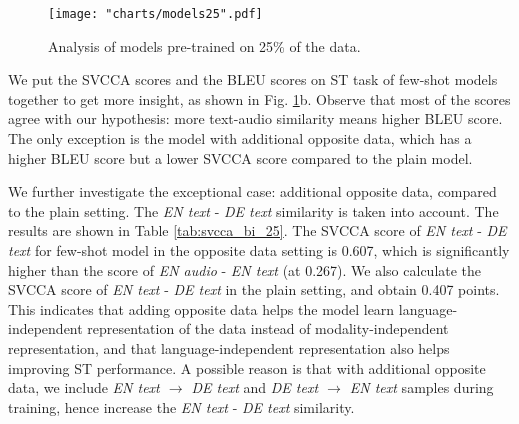 \documentclass[conference]{IEEEtran}
\begin{document}
	\begin{figure}[htbp]
		\centerline{\texttt{[image: "charts/models25".pdf]}}
		\caption{Analysis of models pre-trained on 25\% of the data.}
		\label{fig:models25}
	\end{figure}
	
	
	
	We put the SVCCA scores and the BLEU scores on ST task of few-shot models together to get more insight, as shown in Fig. \ref{fig:models25}b. Observe that most of the scores agree with our hypothesis: more text-audio similarity means higher BLEU score. The only exception is the model with additional opposite data, which has a higher BLEU score but a lower SVCCA score compared to the plain model.
	
	
	We further investigate the exceptional case: additional opposite data, compared to the plain setting. The \textit{EN text} - \textit{DE text} similarity is taken into account. The results are shown in Table \ref{tab:svcca_bi_25}. The SVCCA score of \textit{EN text} - \textit{DE text} for few-shot model in the opposite data setting is 0.607, which is significantly higher than the score of \textit{EN audio} - \textit{EN text} (at 0.267). We also calculate the SVCCA score of \textit{EN text} - \textit{DE text} in the plain setting, and obtain 0.407 points. This indicates that adding opposite data helps the model learn language-independent representation of the data instead of modality-independent representation, and that language-independent representation also helps improving ST performance. A possible reason is that with additional opposite data, we include \textit{EN text $\rightarrow$ DE text} and \textit{DE text $\rightarrow$ EN text} samples during training, hence increase the \textit{EN text} - \textit{DE text} similarity.
	
\end{document}
